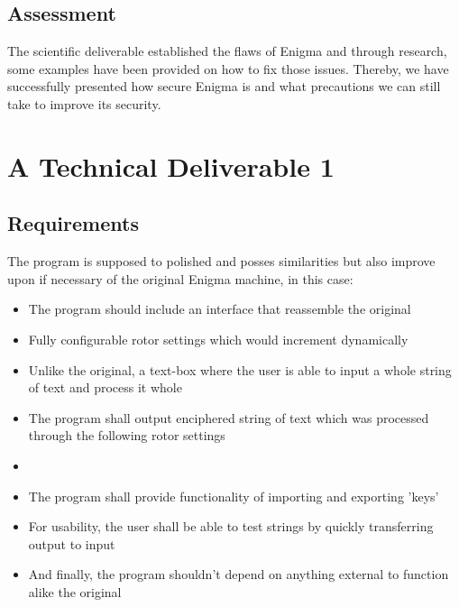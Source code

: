\documentclass[conference,compsoc]{IEEEtran}
\begin{document}
\subsection{Assessment}
The scientific deliverable established the flaws of Enigma and through research, some examples have been provided on how to fix those issues. 
Thereby, we have successfully presented how secure Enigma is and what precautions we can still take to improve its security.\\

\section{ A Technical Deliverable 1}
\label{sec-production}

\subsection{Requirements}
The program is supposed to polished and posses similarities but also improve upon if necessary of the original Enigma machine, in this case:
\begin{itemize}
    \item The program should include an interface that reassemble the original
    \item Fully configurable rotor settings which would increment dynamically
    \item Unlike the original, a text-box where the user is able to input a whole string of text and process it whole
    \item The program shall output enciphered string of text which was processed through the following rotor settings
    \item 
    \item The program shall provide functionality of importing and exporting 'keys'
    \item For usability, the user shall be able to test strings by quickly transferring output to input
    \item And finally, the program shouldn't depend on anything external to function alike the original
\end{itemize}
\end{document}
